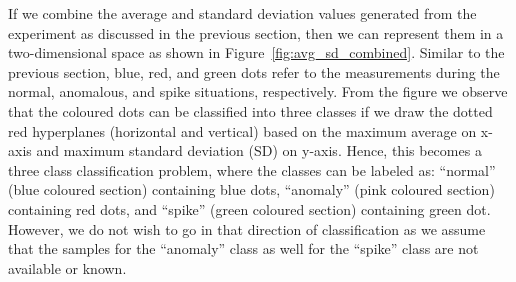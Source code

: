 If we combine the average and standard deviation values generated from the experiment as discussed in the previous section, then we can represent them in a two-dimensional space as shown in Figure~\ref{fig:avg_sd_combined}. Similar to the previous section, blue, red, and green dots refer to the measurements during the normal, anomalous, and spike situations, respectively. From the figure we observe that the coloured dots can be classified into three classes if we draw the dotted red hyperplanes (horizontal and vertical) based on the maximum average on x-axis and maximum standard deviation (SD) on y-axis. Hence, this becomes a three class classification problem, where the classes can be labeled as: ``normal'' (blue coloured section) containing blue dots, ``anomaly'' (pink coloured section) containing red dots, and ``spike'' (green coloured section) containing green dot. However, we do not wish to go in that direction of classification as we assume that the samples for the ``anomaly'' class as well for the ``spike'' class are not available or known. 

